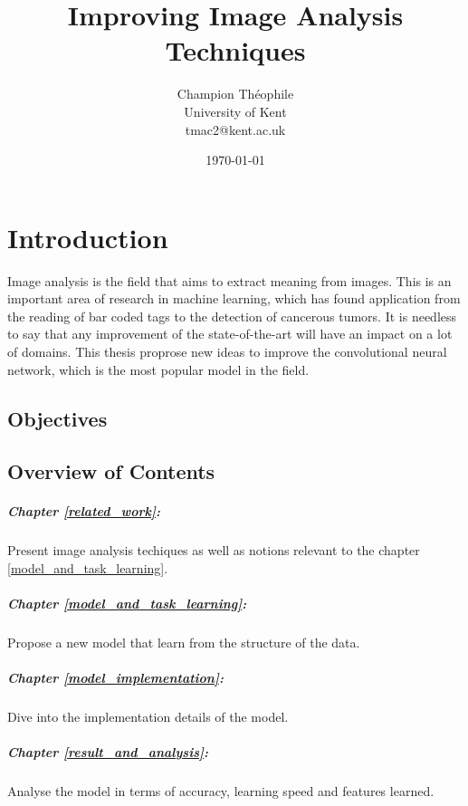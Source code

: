 \documentclass[11pt]{report}
\title{\textbf{Improving Image Analysis Techniques}}
\author{
\begin{tabular}[t]{cc}
Champion Théophile \\
University of Kent \\
tmac2@kent.ac.uk \\
\end{tabular}
}
\date{\today}
\begin{document}
\maketitle

\tableofcontents

\glsaddall
\printglossary[type=\acronymtype, nonumberlist]
\printglossary[type=main, nonumberlist]

\newpage

\chapter{Introduction}

Image analysis is the field that aims to extract meaning from images. This is an important area of research in machine learning, which has found application from the reading of bar coded tags to the detection of cancerous tumors. It is needless to say that any improvement of the state-of-the-art will have an impact on a lot of domains. This thesis proprose new ideas to improve the convolutional neural network, which is the most popular model in the field.

\section{Objectives}


\section{Overview of Contents}

\paragraph{Chapter \ref{related_work}:} Present image analysis techiques as well as notions relevant to the chapter \ref{model_and_task_learning}.
\paragraph{Chapter \ref{model_and_task_learning}:} Propose a new model that learn from the structure of the data.
\paragraph{Chapter \ref{model_implementation}:} Dive into the implementation details of the model.
\paragraph{Chapter \ref{result_and_analysis}:} Analyse the model in terms of accuracy, learning speed and features learned.
\end{document}
